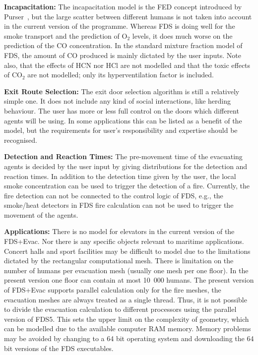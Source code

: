 \documentclass[12pt,a4paper,final,twoside]{stylevk}
\begin{document}
\textbf{Incapacitation:} The incapacitation model is the FED concept
introduced by Purser~\cite{Purser95}, but the large scatter between
different humans is not taken into account in the current version of
the programme.  Whereas FDS is doing well for the smoke transport and
the prediction of O${}_2$ levels, it does much worse on the prediction
of the CO concentration.  In the standard mixture fraction model of
FDS, the amount of CO produced is mainly dictated by the user inputs.
Note also, that the effects of HCN nor HCl are not modelled and that
the toxic effects of CO${}_2$ are not modelled; only its
hyperventilation factor is included.


\textbf{Exit Route Selection:} The exit door selection algorithm is
still a relatively simple one.  It does not include any kind of social
interactions, like herding behaviour.  The user has more or less full
control on the doors which different agents will be using.  In some
applications this can be listed as a benefit of the model, but the
requirements for user's responsibility and expertise should be
recognised.


\textbf{Detection and Reaction Times:} The pre-movement time of the
evacuating agents is decided by the user input by giving distributions
for the detection and reaction times.  In addition to the detection
time given by the user, the local smoke concentration can be used to
trigger the detection of a fire.  Currently, the fire detection can
not be connected to the control logic of FDS, e.g., the
smoke/heat detectors in FDS fire calculation can not be used to
trigger the movement of the agents.


\textbf{Applications:} There is no model for elevators in the current
version of the FDS+Evac.  Nor there is any specific objects relevant
to maritime applications.  Concert halls and sport facilities may be
difficult to model due to the limitations dictated by the rectangular
computational mesh.  There is limitation on the number of humans per
evacuation mesh (usually one mesh per one floor).  In the present
version one floor can contain at most 10~000 humans.  The present
version of FDS+Evac supports parallel calculation only for the fire
meshes, the evacuation meshes are always treated as a single thread.
Thus, it is not possible to divide the evacuation calculation to
different processors using the parallel version of FDS5.  This sets
the upper limit on the complexity of geometry, which can be modelled
due to the available computer RAM memory.  Memory problems may be
avoided by changing to a 64 bit operating system and downloading the
64 bit versions of the FDS executables.
\end{document}
